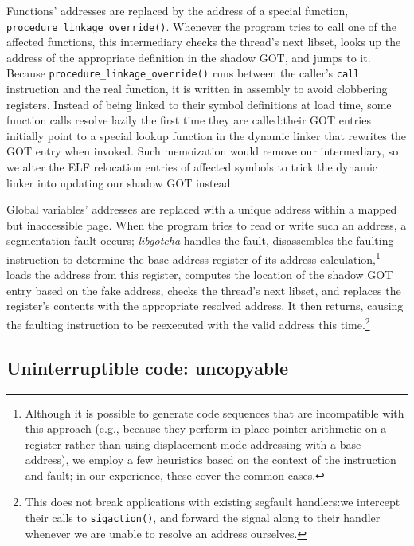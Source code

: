 Functions' addresses are replaced by the address of a special function,
\texttt{procedure\_linkage\_override()}.  Whenever the program tries to call one of
the affected functions, this intermediary checks the thread's next libset, looks up
the address of the appropriate definition in the shadow GOT, and jumps to it.
Because \texttt{procedure\_linkage\_override()} runs between the caller's
\texttt{call} instruction and the real function, it is written in assembly to avoid
clobbering registers.  Instead of being linked to their symbol definitions at load
time, some function calls resolve lazily the first time they are called:\@ their GOT
entries initially point to a special lookup function in the dynamic linker that
rewrites the GOT entry when invoked.  Such memoization would remove our intermediary,
so we alter the ELF relocation entries of affected symbols to trick the dynamic
linker into updating our shadow GOT instead.


Global variables' addresses are replaced with a unique address within a mapped but
inaccessible page.  When the program tries to read or write such an address, a
segmentation fault occurs; \textit{libgotcha} handles the fault, disassembles the
faulting instruction to determine the base address register of its address
calculation,\footnote{Although it is possible to
generate code sequences that are incompatible with this approach (e.g., because they
perform in-place pointer arithmetic on a register rather than using displacement-mode
addressing with a base address), we employ a few heuristics based on the context of
the instruction and fault; in our experience, these cover the common cases.}
loads the address from this register, computes the location of the
shadow GOT entry based on the fake address, checks the thread's next libset, and
replaces the register's contents with the appropriate resolved address.  It then
returns, causing the faulting instruction to be reexecuted with the valid address
this time.\footnote{This does not break applications with existing segfault
handlers:\@ we intercept their calls to \texttt{sigaction()}, and forward the signal
along to their handler whenever we are unable to resolve an address ourselves.}



\subsection{Uninterruptible code: uncopyable}
\label{sec:uncopyable}

